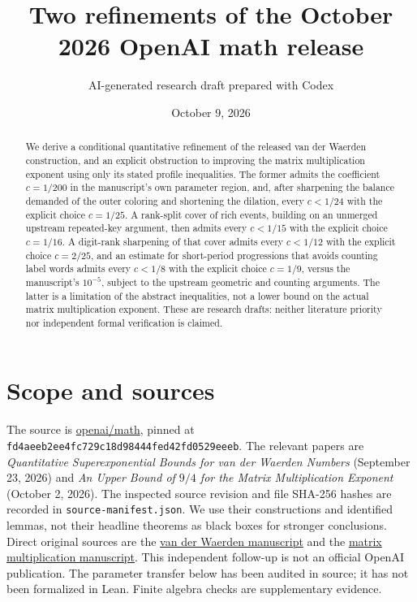 \documentclass[11pt]{article}
\title{Two refinements of the October 2026 OpenAI math release}
\author{AI-generated research draft prepared with Codex}
\date{October 9, 2026}
\begin{document}
\maketitle
\begin{abstract}
We derive a conditional quantitative refinement of the released van der
Waerden construction, and an explicit obstruction to improving the matrix
multiplication exponent using only its stated profile inequalities.
The former admits the coefficient $c=1/200$ in the manuscript's own
parameter region, and, after sharpening the balance demanded of the
outer coloring and shortening the dilation, every $c<1/24$ with the
explicit choice $c=1/25$. A rank-split cover of rich events, building on
an unmerged upstream repeated-key argument, then admits every $c<1/15$
with the explicit choice $c=1/16$. A digit-rank sharpening of that cover
admits every $c<1/12$ with the explicit choice $c=2/25$, and an estimate
for short-period progressions that avoids counting label words admits
every $c<1/8$ with the explicit choice $c=1/9$, versus the manuscript's
$10^{-5}$, subject to the upstream geometric and counting arguments.
The latter is a limitation of the abstract inequalities, not a lower bound
on the actual matrix multiplication exponent. These are research drafts:
neither literature priority nor independent formal verification is claimed.
\end{abstract}

\section{Scope and sources}
The source is \href{https://github.com/openai/math}{openai/math}, pinned at
\texttt{fd4aeeb2ee4fc729c18d98444fed42fd0529eeeb}.
The relevant papers are \emph{Quantitative Superexponential Bounds for van
der Waerden Numbers} (September 23, 2026) and \emph{An Upper Bound of
$9/4$ for the Matrix Multiplication Exponent} (October 2, 2026).
The inspected source revision and file SHA-256 hashes are recorded in
\texttt{source-manifest.json}. We use their constructions and identified
lemmas, not their headline theorems as black boxes for stronger conclusions.
Direct original sources are the
\href{https://github.com/openai/math/tree/fd4aeeb2ee4fc729c18d98444fed42fd0529eeeb/preprints/Quantitative-Superexponential-Bounds-for-van-der-Waerden-Numbers-September-23-2026}{van der Waerden manuscript}
and the
\href{https://github.com/openai/math/tree/fd4aeeb2ee4fc729c18d98444fed42fd0529eeeb/preprints/Matrix-Multiplication-Nine-Fourths-October-2-2026}{matrix multiplication manuscript}.
This independent follow-up is not an official OpenAI publication.
The parameter transfer below has been audited in source; it has not been
formalized in Lean. Finite algebra checks are supplementary evidence.
\end{document}
